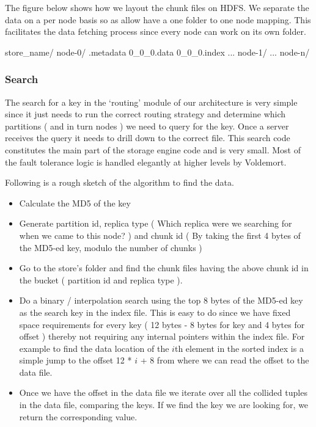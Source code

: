 \documentclass[10pt,twocolumn,preprint,natbib,authoryear]{sigplanconf}
\begin{document}
The figure below shows how we layout the chunk files on HDFS. We separate the data on a per node basis so as allow have a one folder to one node mapping. This facilitates the data fetching process since every node can work on its own folder. 

\scriptsize
\begin{verbatimtab}
store_name/
  node-0/
    .metadata
    0_0_0.data
    0_0_0.index
    ...
  node-1/
  ...
  node-n/
\end{verbatimtab}
\normalsize
\subsubsection{Search}

The search for a key in the `routing' module of our architecture is very simple since it just needs to run the correct routing strategy and determine which partitions ( and in turn nodes ) we need to query for the key. Once a server receives the query it needs to drill down to the correct file. This search code constitutes the main part of the storage engine code and is very small. Most of the fault tolerance logic is handled elegantly at higher levels by Voldemort.

Following is a rough sketch of the algorithm to find the data. 

\begin{itemize}
	\item Calculate the MD5 of the key
	\item Generate partition id, replica type ( Which replica were we searching for when we came to this node? ) and chunk id ( By taking the first 4 bytes of the MD5-ed key, modulo the number of chunks )
	\item Go to the store's folder and find the chunk files having the above chunk id in the bucket ( partition id and replica type ). 
	\item Do a binary / interpolation search using the top 8 bytes of the MD5-ed key as the search key in the index file. This is easy to do since we have fixed space requirements for every key ( 12 bytes - 8 bytes for key and 4 bytes for offset ) thereby not requiring any internal pointers within the index file. For example to find the data location of the $i$th element in the sorted index is a simple jump to the offset 12 * $i$ + 8 from where we can read the offset to the data file.  
	\item Once we have the offset in the data file we iterate over all the collided tuples in the data file, comparing the keys. If we find the key we are looking for, we return the corresponding value.
\end{itemize}
\end{document}
